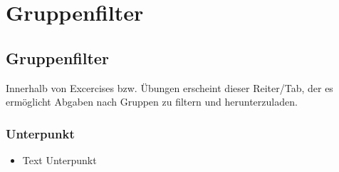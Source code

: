 \chapter{Gruppenfilter}\label{gruppenfilter}
\minitoc
\clearpage
\section{Gruppenfilter}
Innerhalb von Excercises bzw. Übungen erscheint dieser Reiter/Tab, der es ermöglicht Abgaben nach Gruppen zu filtern und herunterzuladen. 

\subsection*{Unterpunkt}
\begin{itemize}
	\item Text Unterpunkt
\end{itemize}

\clearpage